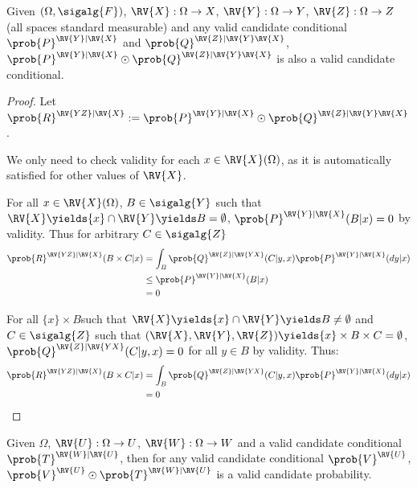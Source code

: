 \begin{lemma}\label{lem:valid_extendability}
Given $(\Omega,\sigalg{F})$, $\RV{X}:\Omega\to X$, $\RV{Y}:\Omega\to Y$, $\RV{Z}:\Omega\to Z$ (all spaces standard measurable) and any valid candidate conditional $\prob{P}^{\RV{Y}|\RV{X}}$ and $\prob{Q}^{\RV{Z}|\RV{Y}\RV{X}}$, $ \prob{P}^{\RV{Y}|\RV{X}}\odot \prob{Q}^{\RV{Z}|\RV{Y}\RV{X}}$ is also a valid candidate conditional.
\end{lemma}

\begin{proof}
Let $\prob{R}^{\RV{YZ}|\RV{X}}:=\prob{P}^{\RV{Y}|\RV{X}}\odot \prob{Q}^{\RV{Z}|\RV{Y}\RV{X}}$.

We only need to check validity for each $x\in \RV{X}(\Omega)$, as it is automatically satisfied for other values of $\RV{X}$.

For all $x\in \RV{X}(\Omega)$, $B\in \sigalg{Y}$ such that $\RV{X}\yields \{x\}\cap\RV{Y}\yields B=\emptyset$, $\prob{P}^{\RV{Y}|\RV{X}}(B|x)=0$ by validity. Thus for arbitrary $C\in \sigalg{Z}$
\begin{align}
    \prob{R}^{\RV{YZ}|\RV{X}}(B\times C|x) &= \int_B \prob{Q}^{\RV{Z}|\RV{YX}}(C|y,x)\prob{P}^{\RV{Y}|\RV{X}}(dy|x)\\
                                  &\leq \prob{P}^{\RV{Y}|\RV{X}}(B|x)\\
                                  &=0
\end{align}

For all $\{x\}\times B$such that $\RV{X}\yields \{x\}\cap\RV{Y}\yields B\neq \emptyset$ and $C\in \sigalg{Z}$ such that $(\RV{X},\RV{Y},\RV{Z})\yields \{x\}\times B\times C=\emptyset$, $\prob{Q}^{\RV{Z}|\RV{YX}}(C|y,x)=0$ for all $y\in B$ by validity. Thus:
\begin{align}
    \prob{R}^{\RV{YZ}|\RV{X}}(B\times C|x) &= \int_B \prob{Q}^{\RV{Z}|\RV{YX}}(C|y,x)\prob{P}^{\RV{Y}|\RV{X}}(dy|x)\\
                                            &=0
\end{align}
\end{proof}

\begin{corollary}\label{corr:valid_extend_order1}
Given $\Omega$, $\RV{U}:\Omega\to U$, $\RV{W}:\Omega\to W$ and a valid candidate conditional $\prob{T}^{\RV{W}|\RV{U}}$, then for any valid candidate conditional $\prob{V}^{\RV{U}}$, $\prob{V}^{\RV{U}}\odot \prob{T}^{\RV{W}|\RV{U}}$ is a valid candidate probability.
\end{corollary}

